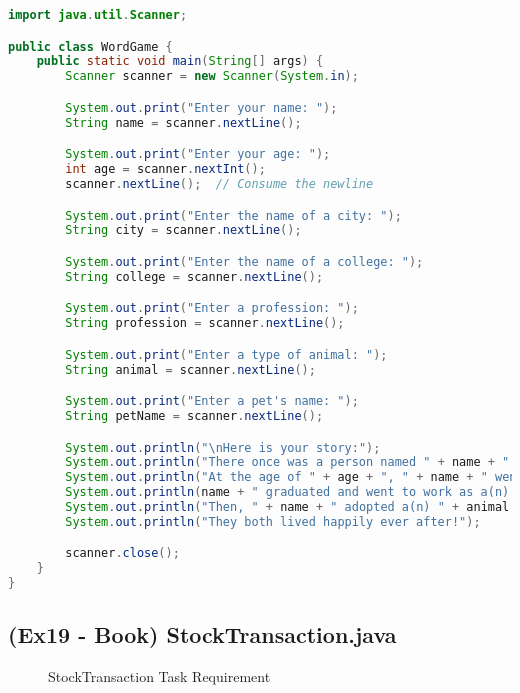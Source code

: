 \documentclass{article}
\begin{document}
\begin{lstlisting}[language=Java, caption=WordGame.java]
import java.util.Scanner;

public class WordGame {
    public static void main(String[] args) {
        Scanner scanner = new Scanner(System.in);

        System.out.print("Enter your name: ");
        String name = scanner.nextLine();

        System.out.print("Enter your age: ");
        int age = scanner.nextInt();
        scanner.nextLine();  // Consume the newline

        System.out.print("Enter the name of a city: ");
        String city = scanner.nextLine();

        System.out.print("Enter the name of a college: ");
        String college = scanner.nextLine();

        System.out.print("Enter a profession: ");
        String profession = scanner.nextLine();

        System.out.print("Enter a type of animal: ");
        String animal = scanner.nextLine();

        System.out.print("Enter a pet's name: ");
        String petName = scanner.nextLine();

        System.out.println("\nHere is your story:");
        System.out.println("There once was a person named " + name + " who lived in " + city + ".");
        System.out.println("At the age of " + age + ", " + name + " went to college at " + college + ".");
        System.out.println(name + " graduated and went to work as a(n) " + profession + ".");
        System.out.println("Then, " + name + " adopted a(n) " + animal + " named " + petName + ".");
        System.out.println("They both lived happily ever after!");

        scanner.close();
    }
}
\end{lstlisting}

\subsection*{(Ex19 - Book) StockTransaction.java}

\begin{figure}[H]
    \centering
    \caption{StockTransaction Task Requirement}
\end{figure}
\end{document}
